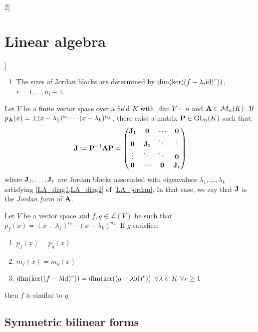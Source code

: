 \documentclass[../../../main.tex]{subfiles}
\begin{document}
\begin{multicols}{2}[\section{Linear algebra}]
\begin{prop}
\begin{enumerate}
      \item\label{LA_diag2} The sizes of Jordan blocks are determined by $\dim(\ker((f-\lambda_i\mathrm{id})^r))$, $r=1,\ldots,n_i-1$.
    \end{enumerate}
  \end{prop}
  \begin{prop}
    Let $V$ be a finite vector space over a field $K$ with $\dim V=n$ and $\boldsymbol{\mathrm{A}}\in\mathcal{M}_n(K)$. If $p_{\boldsymbol{\mathrm{A}}}(x)=\pm(x-\lambda_1)^{n_1}\cdots(x-\lambda_k)^{n_k}$, there exist a matrix $\boldsymbol{\mathrm{P}}\in\mathrm{GL}_n(K)$ such that:
    $$\boldsymbol{\mathrm{J}}:=\boldsymbol{\mathrm{P}}^{-1}\boldsymbol{\mathrm{A}}\boldsymbol{\mathrm{P}}=
      \begin{pmatrix}
        \boldsymbol{\mathrm{J}}_1 & \boldsymbol{\mathrm{0}}   & \cdots             & \boldsymbol{\mathrm{0}}   \\
        \boldsymbol{\mathrm{0}}   & \boldsymbol{\mathrm{J}}_2 & \ddots             & \vdots               \\
        \vdots               & \ddots               & \ddots             & \boldsymbol{\mathrm{0}}   \\
        \boldsymbol{\mathrm{0}}   & \cdots               & \boldsymbol{\mathrm{0}} & \boldsymbol{\mathrm{J}}_r \\
      \end{pmatrix}
    $$
    where $\boldsymbol{\mathrm{J}}_1,\ldots,\boldsymbol{\mathrm{J}}_r$ are Jordan blocks associated with eigenvalues $\lambda_1,\ldots,\lambda_k$ satisfying \cref{LA_diag1,LA_diag2} of \cref{LA_jordan}. In that case, we say that $\boldsymbol{\mathrm{J}}$ is the \emph{Jordan form} of $\boldsymbol{\mathrm{A}}$.
  \end{prop}
  \begin{theorem}
    Let $V$ be a vector space and $f,g\in\mathcal{L}(V)$ be such that $p_f(x)=(x-\lambda_1)^{n_1}\cdots(x-\lambda_k)^{n_k}$. If $g$ satisfies:
    \begin{enumerate}
      \item $p_f(x)=p_g(x)$
      \item $m_f(x)=m_g(x)$
      \item $\dim(\ker((f-\lambda \mathrm{id})^r))=\dim(\ker((g-\lambda \mathrm{id})^r))$ $\forall\lambda\in K$ $\forall r\geq 1$
    \end{enumerate}
    then $f$ is similar to $g$.
  \end{theorem}
  \subsection{Symmetric bilinear forms}

\end{multicols}
\end{document}
